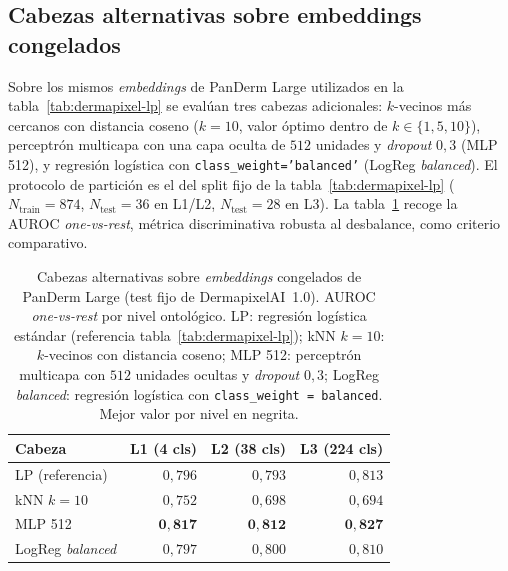 \subsection*{Cabezas alternativas sobre embeddings congelados}

Sobre los mismos \emph{embeddings} de PanDerm Large utilizados en la
tabla~\ref{tab:dermapixel-lp} se evalúan tres cabezas adicionales:
$k$-vecinos más cercanos con distancia coseno ($k = 10$, valor
óptimo dentro de $k \in \{1, 5, 10\}$), perceptrón multicapa con
una capa oculta de $512$ unidades y \emph{dropout} $0{,}3$ (MLP
512), y regresión logística con \texttt{class\_weight='balanced'}
(LogReg \emph{balanced}). El protocolo de partición es el del split
fijo de la tabla~\ref{tab:dermapixel-lp}
($N_{\mathrm{train}} = 874$, $N_{\mathrm{test}} = 36$ en L1/L2,
$N_{\mathrm{test}} = 28$ en L3). La tabla~\ref{tab:dermapixel-heads}
recoge la AUROC \emph{one-vs-rest}, métrica discriminativa robusta
al desbalance, como criterio comparativo.

\begin{table}[H]
\centering
\footnotesize
\setlength{\tabcolsep}{4pt}
\renewcommand{\arraystretch}{0.95}
\caption{Cabezas alternativas sobre \emph{embeddings} congelados de
PanDerm Large (test fijo de DermapixelAI~1.0). AUROC
\emph{one-vs-rest} por nivel ontológico. LP: regresión logística
estándar (referencia tabla~\ref{tab:dermapixel-lp}); kNN $k=10$:
$k$-vecinos con distancia coseno; MLP 512: perceptrón multicapa
con $512$ unidades ocultas y \emph{dropout} $0{,}3$; LogReg
\emph{balanced}: regresión logística con \texttt{class\_weight =
balanced}. Mejor valor por nivel en negrita.}
\label{tab:dermapixel-heads}
\begin{tabular}{lrrr}
\hline
Cabeza                & L1 (4 cls)         & L2 (38 cls)        & L3 (224 cls) \\
\hline
LP (referencia)       & $0{,}796$          & $0{,}793$          & $0{,}813$ \\
kNN $k=10$            & $0{,}752$          & $0{,}698$          & $0{,}694$ \\
MLP 512               & $\mathbf{0{,}817}$ & $\mathbf{0{,}812}$ & $\mathbf{0{,}827}$ \\
LogReg \emph{balanced}& $0{,}797$          & $0{,}800$          & $0{,}810$ \\
\hline
\end{tabular}
\end{table}

